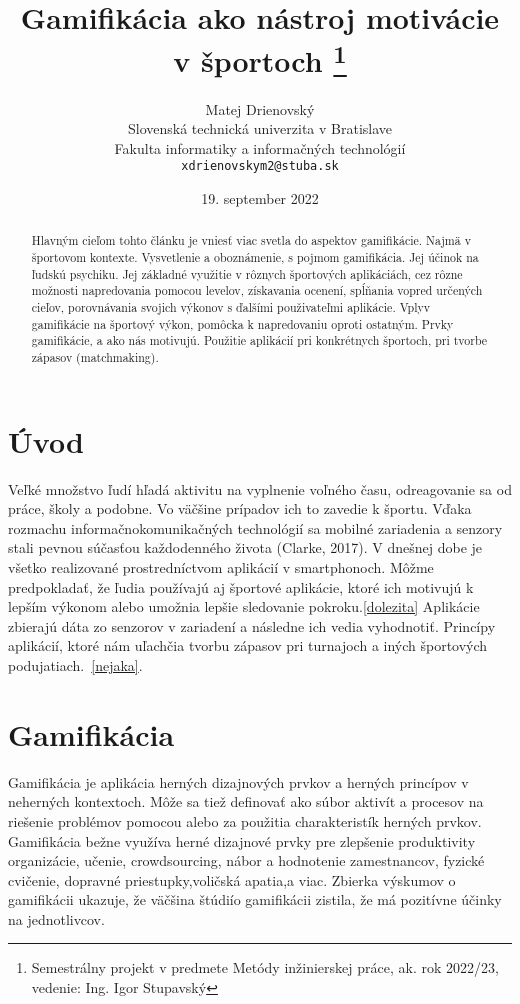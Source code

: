 \documentclass[10pt,twoside,slovak,a4paper]{coursepaper}
\title{Gamifikácia ako nástroj motivácie v športoch
\thanks{Semestrálny projekt v predmete Metódy inžinierskej práce, ak. rok 2022/23, vedenie: Ing. Igor Stupavský}} %
\author{Matej Drienovský\\[2pt]
	{\small Slovenská technická univerzita v Bratislave}\\
	{\small Fakulta informatiky a informačných technológií}\\
	{\small \texttt{xdrienovskym2@stuba.sk}}
	}
\date{\small 19. september 2022} %
\begin{document}
\maketitle

\begin{abstract}
Hlavným cieľom tohto článku je vniesť viac svetla do aspektov
gamifikácie. Najmä
v športovom kontexte. Vysvetlenie a oboznámenie, s pojmom gamifikácia. Jej účinok na
ľudskú psychiku. Jej základné využitie v rôznych športových aplikáciách, cez rôzne možnosti
napredovania pomocou levelov, získavania ocenení, spĺňania vopred určených cieľov,
porovnávania svojich výkonov s ďalšími použivateľmi aplikácie. Vplyv gamifikácie na športový
výkon, pomôcka k napredovaniu oproti ostatným. Prvky gamifikácie, a ako nás motivujú. Použitie aplikácií pri konkrétnych športoch, pri tvorbe zápasov
(matchmaking).
\end{abstract}



\section{Úvod}

Veľké množstvo ľudí hľadá aktivitu na vyplnenie voľného času, odreagovanie sa od práce, školy a podobne. Vo väčšine prípadov ich to zavedie k športu. 
Vďaka rozmachu informačnokomunikačných technológií sa mobilné zariadenia a senzory stali pevnou súčasťou každodenného života (Clarke, 2017).
V dnešnej dobe je všetko realizované prostredníctvom aplikácií v smartphonoch. 
Môžme predpokladať, že ľudia používajú aj športové aplikácie, ktoré ich motivujú k lepším výkonom alebo umožnia lepšie sledovanie pokroku.\ref{dolezita} Aplikácie zbierajú dáta zo senzorov v zariadení a následne ich vedia vyhodnotiť.
Princípy aplikácií, ktoré nám uľachčia tvorbu zápasov pri turnajoch a iných športových podujatiach.~\ref{nejaka}.   




\section{Gamifikácia} \label{gamifikácia}

\begin{figure*}[tbh]

Gamifikácia je aplikácia herných dizajnových prvkov a herných princípov v neherných kontextoch. Môže sa tiež definovať ako súbor aktivít a procesov na riešenie problémov pomocou alebo za použitia charakteristík herných prvkov. Gamifikácia bežne využíva herné dizajnové
prvky pre zlepšenie produktivity organizácie, učenie, crowdsourcing, nábor a hodnotenie zamestnancov, fyzické cvičenie, dopravné priestupky,voličská apatia,a viac. Zbierka výskumov o gamifikácii ukazuje, že väčšina štúdiío gamifikácii zistila, že má pozitívne účinky na jednotlivcov.

\end{figure*}
\end{document}
